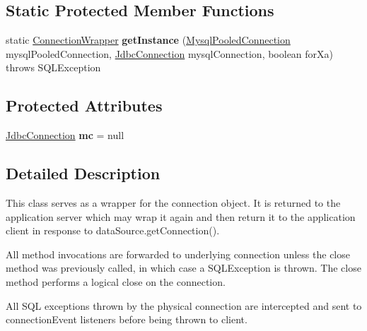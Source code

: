 \subsection*{Static Protected Member Functions}
\begin{DoxyCompactItemize}
\item 
\mbox{\label{classcom_1_1mysql_1_1cj_1_1jdbc_1_1_connection_wrapper_ad9866059f50d1008a2ffb298467736c0}} 
static \mbox{\hyperlink{classcom_1_1mysql_1_1cj_1_1jdbc_1_1_connection_wrapper}{Connection\+Wrapper}} {\bfseries get\+Instance} (\mbox{\hyperlink{classcom_1_1mysql_1_1cj_1_1jdbc_1_1_mysql_pooled_connection}{Mysql\+Pooled\+Connection}} mysql\+Pooled\+Connection, \mbox{\hyperlink{interfacecom_1_1mysql_1_1cj_1_1jdbc_1_1_jdbc_connection}{Jdbc\+Connection}} mysql\+Connection, boolean for\+Xa)  throws S\+Q\+L\+Exception 
\end{DoxyCompactItemize}
\subsection*{Protected Attributes}
\begin{DoxyCompactItemize}
\item 
\mbox{\label{classcom_1_1mysql_1_1cj_1_1jdbc_1_1_connection_wrapper_a6d5e7cd28deac2089c54a5c79e6d5efc}} 
\mbox{\hyperlink{interfacecom_1_1mysql_1_1cj_1_1jdbc_1_1_jdbc_connection}{Jdbc\+Connection}} {\bfseries mc} = null
\end{DoxyCompactItemize}


\subsection{Detailed Description}
This class serves as a wrapper for the connection object. It is returned to the application server which may wrap it again and then return it to the application client in response to data\+Source.\+get\+Connection().

All method invocations are forwarded to underlying connection unless the close method was previously called, in which case a S\+Q\+L\+Exception is thrown. The close method performs a \textquotesingle{}logical close\textquotesingle{} on the connection.

All S\+QL exceptions thrown by the physical connection are intercepted and sent to connection\+Event listeners before being thrown to client. 

